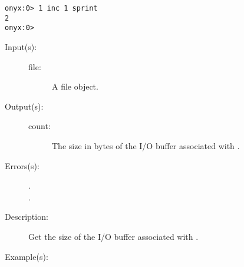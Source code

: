 \begin{description}
\begin{description}
\begin{verbatim}
onyx:0> 1 inc 1 sprint
2
onyx:0>
		\end{verbatim}
	\end{description}
\label{systemdict:iobuf}
\item[{\onyxop{file}{iobuf}{count}}: ]
	\begin{description}\item[]
	\item[Input(s): ]
		\begin{description}\item[]
		\item[file: ]
			A file object.
		\end{description}
	\item[Output(s): ]
		\begin{description}\item[]
		\item[count: ]
			The size in bytes of the I/O buffer associated with
			.
		\end{description}
	\item[Errors(s): ]
		\begin{description}\item[]
		\item[.]
		\item[.]
		\end{description}
	\item[Description: ]
		Get the size of the I/O buffer associated with .
	\item[Example(s): ]\begin{verbatim}


\end{verbatim}
\end{description}
\end{description}
